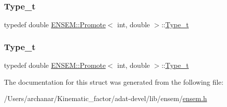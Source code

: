 \mbox{\label{structENSEM_1_1Promote_3_01int_00_01double_01_4_a9336b13a291d56af90484918a2f0ebe5}} 
\subsubsection{\texorpdfstring{Type\_t}{Type\_t}\hspace{0.1cm}{\footnotesize\ttfamily [2/3]}}
{\footnotesize\ttfamily typedef double \mbox{\hyperlink{structENSEM_1_1Promote}{E\+N\+S\+E\+M\+::\+Promote}}$<$ int, double $>$\+::\mbox{\hyperlink{structENSEM_1_1Promote_3_01int_00_01double_01_4_a9336b13a291d56af90484918a2f0ebe5}{Type\+\_\+t}}}

\mbox{\label{structENSEM_1_1Promote_3_01int_00_01double_01_4_a9336b13a291d56af90484918a2f0ebe5}} 
\subsubsection{\texorpdfstring{Type\_t}{Type\_t}\hspace{0.1cm}{\footnotesize\ttfamily [3/3]}}
{\footnotesize\ttfamily typedef double \mbox{\hyperlink{structENSEM_1_1Promote}{E\+N\+S\+E\+M\+::\+Promote}}$<$ int, double $>$\+::\mbox{\hyperlink{structENSEM_1_1Promote_3_01int_00_01double_01_4_a9336b13a291d56af90484918a2f0ebe5}{Type\+\_\+t}}}



The documentation for this struct was generated from the following file\+:\begin{DoxyCompactItemize}
\item 
/\+Users/archanar/\+Kinematic\+\_\+factor/adat-\/devel/lib/ensem/\mbox{\hyperlink{adat-devel_2lib_2ensem_2ensem_8h}{ensem.\+h}}\end{DoxyCompactItemize}
